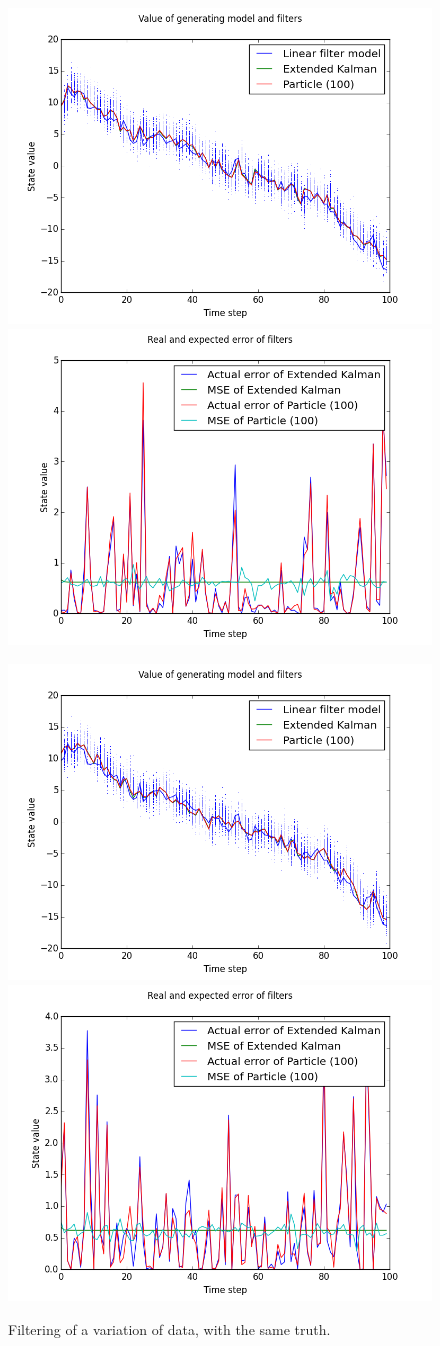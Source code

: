 \documentclass[paper=a4, fontsize=11pt]{scrartcl} %
\numberwithin{equation}{section} %
\numberwithin{figure}{section} %
\numberwithin{table}{section} %
\begin{document}
\begin{figure}
\centerline{
\includegraphics[width=.7\textwidth]{fig/figure_9}
\includegraphics[width=.7\textwidth]{fig/figure_10}}
\centerline{
\includegraphics[width=.7\textwidth]{fig/figure_11}
\includegraphics[width=.7\textwidth]{fig/figure_12}}
\caption{Filtering of a variation of data, with the same truth.}\label{fig:4}
\end{figure}
\end{document}
